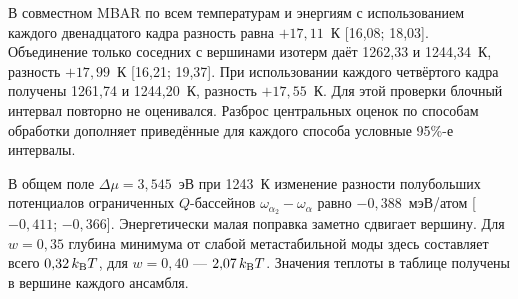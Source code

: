 \documentclass[11pt,a4paper]{article}
\begin{document}
В совместном MBAR по всем температурам и энергиям с использованием каждого двенадцатого кадра разность равна \(+17{,}11\)~К [16,08; 18,03]. Объединение только соседних с вершинами изотерм даёт 1262,33 и 1244,34~К, разность \(+17{,}99\)~К [16,21; 19,37]. При использовании каждого четвёртого кадра получены 1261,74 и 1244,20~К, разность \(+17{,}55\)~К. Для этой проверки блочный интервал повторно не оценивался. Разброс центральных оценок по способам обработки дополняет приведённые для каждого способа условные 95\%-е интервалы.

В общем поле \(\Delta\mu=3{,}545\)~эВ при 1243~К изменение разности полубольших потенциалов ограниченных \(Q\)-бассейнов \(\omega_{\alpha_2}-\omega_\alpha\) равно \(-0{,}388\)~мэВ/атом [\(-0{,}411\); \(-0{,}366\)]. Энергетически малая поправка заметно сдвигает вершину. Для \(w=0{,}35\) глубина минимума от слабой метастабильной моды здесь составляет всего \(0{,}32\,k_{\rm B}T\), для \(w=0{,}40\) --- \(2{,}07\,k_{\rm B}T\). Значения теплоты в таблице получены в вершине каждого ансамбля.
\clearpage
\end{document}
